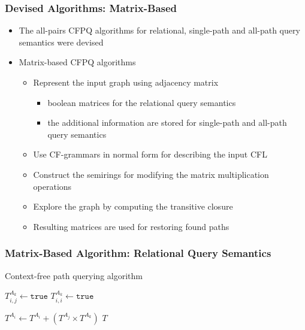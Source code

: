 \documentclass[xcolor=table,aspectratio=169]{beamer}
\begin{document}
\begin{frame}[fragile] \frametitle{Devised Algorithms: Matrix-Based}
	\begin{itemize}
		\item The all-pairs CFPQ algorithms for relational, single-path and all-path query semantics were devised
		\item Matrix-based CFPQ algorithms
		\begin{itemize}
			\item Represent the input graph using adjacency matrix
			\begin{itemize}
				\item boolean matrices for the relational query semantics	
				\item the additional information are stored for single-path and all-path query semantics
			\end{itemize}
			\item Use CF-grammars in normal form for describing the input CFL
			\item Construct the semirings for modifying the matrix multiplication operations
			\item Explore the graph by computing the transitive closure
			\item Resulting matrices are used for restoring found paths 
		\end{itemize}
	\end{itemize}
\end{frame}

  \begin{frame}[fragile] \frametitle{Matrix-Based Algorithm: Relational Query Semantics}
    	\begin{algorithm}[H]
    		\begin{algorithmic}[1]
    			\caption{Context-free path querying algorithm}
    			\label{lst:algo1}
    			{$T^{A_k}_{i,j} \gets \texttt{true}$}
    			\EndFor
    			{$T^{A_k}_{i,i} \gets \texttt{true}$}
    			\EndFor
    			\EndFor
    			
    			{ $T^{A_i} \gets T^{A_i} + (T^{A_j} \times T^{A_k})$ } 
    			\EndFor
    			\EndWhile
    			\State \Return $T$
    			\EndFunction
    		\end{algorithmic}
    	\end{algorithm}
  \end{frame}
\end{document}

